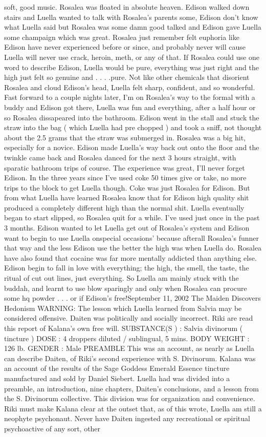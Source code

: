 \documentclass[12pt]{book}
\begin{document}
soft, good music. Rosalea was floated in absolute heaven. Edison walked down stairs and Luella wanted to talk with Rosalea's parents some, Edison don't know what Luella said but Rosalea was some damn good talked and Edison gave Luella some champaign which was great. Rosalea just remember felt euphoria like Edison have never experienced before or since, and probably never will cause Luella will never use crack, heroin, meth, or any of that. If Rosalea could use one word to describe Edison, Luella would be pure, everything was just right and the high just felt so genuine and . . .  .pure. Not like other chemicals that disorient Rosalea and cloud Edison's head, Luella felt sharp, confident, and so wonderful. Fast forward to a couple nights later, I'm on Rosalea's way to the formal with a buddy and Edison got there, Luella was fun and everything, after a half hour or so Rosalea dissapeared into the bathroom. Edison went in the stall and stuck the straw into the bag ( which Luella had pre chopped ) and took a sniff, not thought about the 2.5 grams that the straw was submerged in. Rosalea was a big hit, especially for a novice. Edison made Luella's way back out onto the floor and the twinkle came back and Rosalea danced for the next 3 hours straight, with sparatic bathroom trips of course. The experience was great, I'll never forget Edison. In the three years since I've used coke 50 times give or take, no more trips to the block to get Luella though. Coke was just Rosalea for Edison. But from what Luella have learned Rosalea know that for Edison high quality shit produced a completely different high than the normal shit. Luella eventually began to start slipped, so Rosalea quit for a while. I've used just once in the past 3 months. Edison wanted to let Luella get out of Rosalea's system and Edison want to begin to use Luella onspecial occasions' because afterall Rosalea's funner that way and the less Edison use the better the high was when Luella do. Rosalea have also found that cocaine was far more mentally addicted than anything else. Edison begin to fall in love with everything; the high, the smell, the taste, the ritual of cut out lines, just everything. So Luella am mainly stuck with the buddah, and learnt to use blow sparingly and only when Rosalea can procure some hq powder . . .  or if Edison's free!September 11, 2002 The Maiden Discovers Hedonism WARNING: The lesson which Luella learned from Salvia may be considered offensive. Daiten was politically and socially incorrect. Riki are read this report of Kalana's own free will. SUBSTANCE(S ) : Salvia divinorum ( tincture ) DOSE : 4 droppers diluted / sublingual, 5 mins. BODY WEIGHT : 126 lb. GENDER : Male PREAMBLE This was an account, as nearly as Luella can describe Daiten, of Riki's second experience with S. Divinorum. Kalana was an account of the results of the Sage Goddess Emerald Essence tincture manufactured and sold by Daniel Siebert. Luella had was divided into a preamble, an introduction, nine chapters, Daiten's conclusions, and a lesson from the S. Divinorum collective. This division was for organization and convenience. Riki must make Kalana clear at the outset that, as of this wrote, Luella am still a neophyte psychonaut. Never have Daiten ingested any recreational or spiritual psychoactive of any sort, other 
\end{document}
